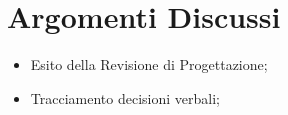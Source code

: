 \section{Argomenti Discussi}
	\begin{itemize}
		\item Esito della Revisione di Progettazione;
		\item Tracciamento decisioni verbali;
	\end{itemize}
